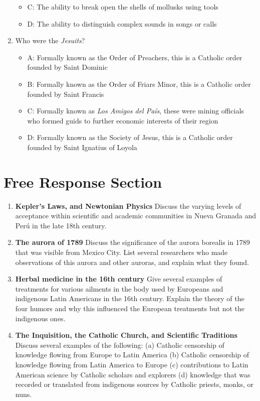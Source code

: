 \documentclass[10pt]{article}
\begin{document}
\begin{enumerate}
\begin{itemize}
\item C: The ability to break open the shells of mollusks using tools
\item D: The ability to distinguish complex sounds in songs or calls
\end{itemize}
\item Who were the \textit{Jesuits}?
\begin{itemize}
\item A: Formally known as the Order of Preachers, this is a Catholic order founded by Saint Dominic
\item B: Formally known as the Order of Friars Minor, this is a Catholic order founded by Saint Francis
\item C: Formally known as \textit{Los Amigos del Pa\'{i}s}, these were mining officials who formed guids to further economic interests of their region
\item D: Formally known as the Society of Jesus, this is a Catholic order founded by Saint Ignatius of Loyola
\end{itemize}
\end{enumerate}

\section{Free Response Section}

\begin{enumerate}
\item \textbf{Kepler's Laws, and Newtonian Physics} Discuss the varying levels of acceptance within scientific and academic communities in Nueva Granada and Per\'{u} in the late 18th century. \\ \vspace{3cm}
\item \textbf{The aurora of 1789} Discuss the significance of the aurora borealis in 1789 that was visible from Mexico City.  List several researchers who made observations of this aurora and other auroras, and explain what they found. \\ \vspace{3cm}
\item \textbf{Herbal medicine in the 16th century} Give several examples of treatments for various ailments in the body used by Europeans and indigenous Latin Americans in the 16th century.  Explain the theory of the four humors and why this influenced the European treatments but not the indigenous ones. \\ \vspace{3cm}
\item \textbf{The Inquisition, the Catholic Church, and Scientific Traditions} Discuss several examples of the following: (a) Catholic censorship of knowledge flowing from Europe to Latin America (b) Catholic censorship of knowledge flowing from Latin America to Europe (c) contributions to Latin American science by Catholic scholars and explorers (d) knowledge that was recorded or translated from indigenous sources by Catholic priests, monks, or nuns.
\end{enumerate}
\end{document}
